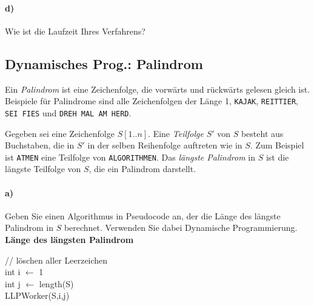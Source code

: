 \documentclass[paper=a4, fontsize=11pt]{scrartcl}
\numberwithin{equation}{section}
\numberwithin{figure}{section}
\numberwithin{table}{section}
\begin{document}
\paragraph{d)}
 Wie ist die Laufzeit Ihres Verfahrens? \\

\subsection{Dynamisches Prog.: Palindrom}
Ein \emph{Palindrom} ist eine Zeichenfolge, die vorwärts und rückwärts gelesen gleich ist. Beispiele für Palindrome sind alle Zeichenfolgen
der Länge 1, \texttt{KAJAK}, \texttt{REITTIER}, \texttt{SEI FIES} und \texttt{DREH MAL AM HERD}.

\smallskip\noindent
Gegeben sei eine Zeichenfolge $S[1..n]$. Eine \emph{Teilfolge} $S'$ von $S$ besteht aus Buchstaben,
die in $S'$ in der selben Reihenfolge auftreten wie in $S$. Zum Beispiel ist
\texttt{ATMEN} eine Teilfolge von \texttt{ALGORITHMEN}. Das \emph{längste Palindrom} in $S$ ist
die längste Teilfolge von $S$, die ein Palindrom darstellt.

\paragraph{a)}
Geben Sie einen Algorithmus in Pseudocode an, der die Länge des längste Palindrom in $S$ berechnet. Verwenden Sie dabei Dynamische Programmierung. \\

\textbf{Länge des längsten Palindrom} \\
\begin{algorithm}[H]
\SetAlgoLined
{}
 // löschen aller Leerzeichen \\
int i $\leftarrow$ 1 \\
int j $\leftarrow$ length(S) \\
\Return LLPWorker(S,i,j)
\end{algorithm} \\
\end{document}
